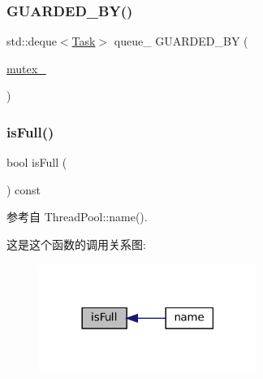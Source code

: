 \mbox{\label{classmuduo_1_1ThreadPool_aa65d6f2d969cc95a8a393bdd2da7b67e}} 
\subsubsection{\texorpdfstring{G\+U\+A\+R\+D\+E\+D\+\_\+\+B\+Y()}{GUARDED\_BY()}\hspace{0.1cm}{\footnotesize\ttfamily [3/3]}}
{\footnotesize\ttfamily std\+::deque$<$\hyperlink{classmuduo_1_1ThreadPool_a46c264006febdf6c5dae5921d59c18d2}{Task}$>$ queue\+\_\+ G\+U\+A\+R\+D\+E\+D\+\_\+\+BY (\begin{DoxyParamCaption}\item[{\hyperlink{classmuduo_1_1ThreadPool_a6e1bf1809a42f40f1a21178dc6620a6f}{mutex\+\_\+}}]{ }\end{DoxyParamCaption})\hspace{0.3cm}{\ttfamily [private]}}

\mbox{\label{classmuduo_1_1ThreadPool_a0b7ed836c5f394b7dde28e7ca17eb40c}} 
\subsubsection{\texorpdfstring{is\+Full()}{isFull()}}
{\footnotesize\ttfamily bool is\+Full (\begin{DoxyParamCaption}{ }\end{DoxyParamCaption}) const\hspace{0.3cm}{\ttfamily [private]}}



参考自 Thread\+Pool\+::name().

这是这个函数的调用关系图\+:
\nopagebreak
\begin{figure}[H]
\begin{center}
\leavevmode
\includegraphics[width=201pt]{classmuduo_1_1ThreadPool_a0b7ed836c5f394b7dde28e7ca17eb40c_icgraph}
\end{center}
\end{figure}
\mbox{\label{classmuduo_1_1ThreadPool_a47f4f0a66d5a539e687100dc65462ced}} 
